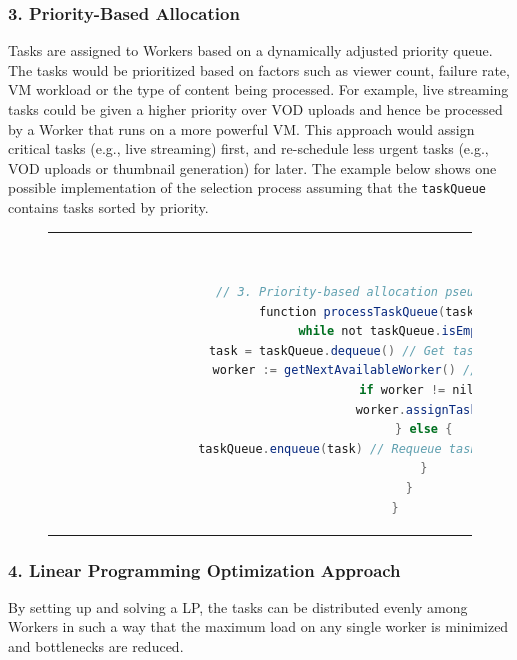 \subsubsection{3. Priority-Based Allocation}
    Tasks are assigned to Workers based on a dynamically adjusted priority queue. The tasks would be prioritized based on factors such as viewer count, failure rate, \ac{VM} workload or the type of content being processed. For example, live streaming tasks could be given a higher priority over \ac{VOD} uploads and hence be processed by a Worker that runs on a more powerful \ac{VM}. This approach would assign critical tasks (e.g., live streaming) first, and re-schedule less urgent tasks (e.g., \ac{VOD} uploads or thumbnail generation) for later. The example below shows one possible implementation of the selection process assuming that the \texttt{taskQueue} contains tasks sorted by priority. 

    \begin{figure}[htpb]
      \begin{tabular}{c}
      \ \small \begin{lstlisting}[language=Java]
        // 3. Priority-based allocation pseudocode
        function processTaskQueue(taskQueue) {
            while not taskQueue.isEmpty() {
                task = taskQueue.dequeue() // Get task with highest priority
                worker := getNextAvailableWorker() // Find available Worker
                if worker != nil {
                    worker.assignTask(task)
                } else {
                    taskQueue.enqueue(task) // Requeue task if no Workers are available
                }
            }
        }
        \end{lstlisting}
      \end{tabular}
      \label{fig:priority-based-allocation}
    \end{figure}

\subsubsection{4. Linear Programming Optimization Approach}

By setting up and solving a \ac{LP}, the tasks can be distributed evenly among Workers in such a way that the maximum load on any single worker is minimized and bottlenecks are reduced.

